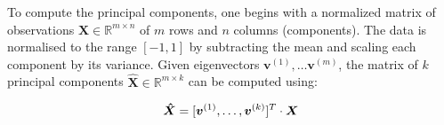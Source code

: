 To compute the principal components, one begins with a normalized matrix of observations $\bm{X} \in \mathbb{R}^{m \times n}$ of $m$ rows and $n$ columns (components). The data is normalised to the range $[-1,1]$ by subtracting the mean and scaling each component by its variance. Given eigenvectors $\bm{v}^{(1)}, \ldots \bm{v}^{(m)}$, the matrix of $k$ principal components $\bm{\hat{X}} \in \mathbb{R}^{m \times k}$ can be computed using:

\begin{equation}
\bm{\hat{X}} = [ \bm{v}^{(1)}, \ldots, \bm{v}^{(k)}]^T \cdot \bm{X}\\
\end{equation}







